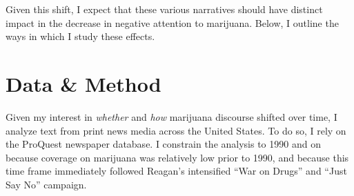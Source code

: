 Given this shift, I expect that these various narratives should have distinct impact in the decrease in negative attention to marijuana. Below, I outline the ways in which I study these effects. 




%

%


\section{Data \& Method}

Given my interest in \textit{whether} and \textit{how} marijuana discourse shifted over time, I analyze text from print news media across the United States. To do so, I rely on the ProQuest newspaper database. I constrain the analysis to 1990 and on because coverage on marijuana was relatively low prior to 1990, and because this time frame immediately followed Reagan's intensified ``War on Drugs'' and ``Just Say No'' campaign. 

